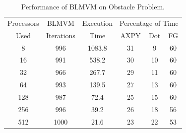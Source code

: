 \begin{table}[bhpt]
\small
\begin{center}
\begin{tabular}{|cccccc|}
\hline
\multicolumn{1}{|c|}{Processors} &
\multicolumn{1}{c|}{BLMVM} &
\multicolumn{1}{c|}{Execution} &
\multicolumn{3}{c|}{Percentage of Time} \\
\multicolumn{1}{|c|}{Used}&
\multicolumn{1}{|c|}{Iterations}&
\multicolumn{1}{c|}{Time}&
\multicolumn{1}{c}{AXPY}&
\multicolumn{1}{c}{Dot} &
\multicolumn{1}{c|}{FG} \\

%
\hline

8 & 996 & 1083.8 & 31  & 9 & 60 \\ %
16 & 991 & 538.2 & 30 & 10 & 60 \\ %
32 & 966 & 267.7 & 29 & 11 & 60 \\ %
64 & 993 & 139.5 & 27 & 13 & 60 \\ %
128 & 987 & 72.4 & 25 & 15 & 60 \\ %
256 & 996 & 39.2 & 26 & 18 & 56 \\ %
512 & 1000 & 21.6 & 23 & 22 & 53 \\
\hline
\end{tabular}
\caption{Performance of BLMVM on Obstacle Problem.}
\label{routines}
\end{center}
\end{table}

